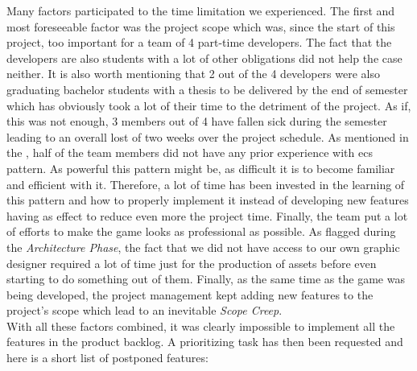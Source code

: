 
Many factors participated to the time limitation we experienced. The first and most foreseeable factor was the project scope which was, since the start of this project, too important for a team of 4 part-time developers. The fact that the developers are also students with a lot of other obligations did not help the case neither. It is also worth mentioning that 2 out of the 4 developers were also graduating bachelor students with a thesis to be delivered by the end of semester which has obviously took a lot of their time to the detriment of the project. As if, this was not enough, 3 members out of 4 have fallen sick during the semester leading to an overall lost of two weeks over the project schedule. As mentioned in the , half of the team members did not have any prior experience with \gls{ecs} pattern. As powerful this pattern might be, as difficult it is to become familiar and efficient with it. Therefore, a lot of time has been invested in the learning of this pattern and how to properly implement it instead of developing new features having as effect to reduce even more the project time. Finally, the team put a lot of efforts to make the game looks as professional as possible. As flagged during the
\textit{Architecture Phase}, the fact that we did not have access to our own graphic designer required a lot of time just for the production of assets before even starting to do something out of them. Finally, as the same time as the game was being developed, the project management kept adding new features to the project's scope which lead to an inevitable \textit{Scope Creep}. \cite{scopeCreep} \\

With all these factors combined, it was clearly impossible to implement all the features in the product backlog. A prioritizing task has then been requested and here is a short list of postponed features:

